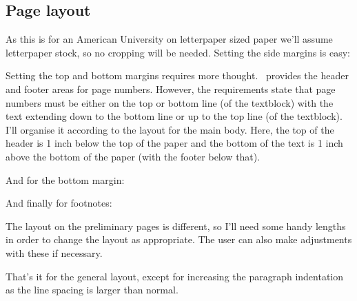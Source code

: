 \subsection{Page layout}

    As this is for an American University on letterpaper sized paper
we'll assume letterpaper stock, so
no cropping will be needed. Setting the side margins is easy:
\begin{lcode}
\setlrmarginsandblock{1.5in}{1in}{*}
\end{lcode}


Setting the top and bottom margins requires more thought. \ltx\ provides the 
header and footer areas for page numbers. However, the requirements state
that page numbers must be either on the top or bottom line (of the textblock)
with the text extending down to the bottom line or up to the top line (of
the textblock). I'll organise it according to the layout for the main body.
Here, the top of the header is 1 inch below the top of the paper and the
bottom of the text is 1 inch above the bottom of the paper (with the footer
below that).
\begin{lcode}
\newlength{\linespace}
\setlength{\linespace}{\baselineskip} %
\setlength{\headheight}{\onelineskip}
\setlength{\headsep}{\linespace}
\addtolength{\headsep}{-\topskip}
\setlength{\uppermargin}{1in}
\addtolength{\uppermargin}{\headheight}
\addtolength{\uppermargin}{\headsep}
\end{lcode}
And for the bottom margin:
\begin{lcode}
\setlength{\lowermargin}{1in}
\setlength{\textheight}{\paperheight}
\addtolength{\textheight}{-\uppermargin}
\addtolength{\textheight}{-\lowermargin}
\end{lcode}
And finally for footnotes:
\begin{lcode}
\setlength{\footskip}{\onelineskip}
\setlength{\footnotesep}{\onelineskip}

\end{lcode}
The layout on the preliminary pages is different, so I'll need
some handy lengths in order to change the layout as appropriate.
The user can also make adjustments with these if necessary.
\begin{lcode}
\newlength{\toptafiddle} \setlength{\toptafiddle}{2\linespace}
\newlength{\bottafiddle} \setlength{\bottafiddle}{0pt}
\newlength{\topfiddle}   \setlength{\topfiddle}{\toptafiddle}
\newlength{\botfiddle}   \setlength{\botfiddle}{\onelineskip}
\end{lcode}
That's it for the general layout, except for increasing the paragraph 
indentation as the line spacing is larger than normal.
\begin{lcode}
\setlength{\parindent}{2em}
\checkandfixthelayout[nearest]

\end{lcode}

